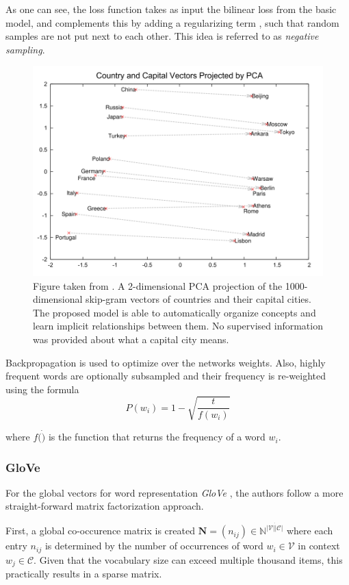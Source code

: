 \documentclass[a4paper,12pt,twoside,openright]{report}
\begin{document}
As one can see, the loss function takes as input the bilinear loss from the basic model, and complements this by adding a regularizing term , such that random samples are not put next to each other.
This idea is referred to as \textit{negative sampling}.

\begin{figure}[h]
	\center
  \includegraphics[width=0.6\linewidth]{./assets/background/word2vec_cities.png}
  \caption{Figure taken from \cite{mikolov13b}. A 2-dimensional PCA projection of the 1000-dimensional skip-gram vectors of countries and their capital cities. The proposed model is able to automatically organize concepts and learn implicit relationships between them. No supervised information was provided about what a capital city means.}
  \label{fig:cbow_skipgram}
\end{figure}


Backpropagation is used to optimize over the networks weights. 
Also, highly frequent words are optionally subsampled and their frequency is re-weighted using the formula $$
P\left(w_{i}\right)=1-\sqrt{\frac{t}{f\left(w_{i}\right)}}
$$

where $f( \dot )$ is the function that returns the frequency of a word $w_i$.

\subsubsection{GloVe}

For the global vectors for word representation \textit{GloVe} \cite{pennington14}, the authors follow a more straight-forward matrix factorization approach.

First, a global co-occurence matrix is created $\mathbf{N} = (n_{ij}) \in \mathbb{N}^{|\mathcal{V}| \dot |\mathcal{C}|}$ where each entry $n_{ij}$ is determined by the number of occurrences of word $w_i \in \mathcal{V}$ in context $w_j \in \mathcal{C}$.
Given that the vocabulary size can exceed multiple thousand items, this practically results in a sparse matrix.
\end{document}
